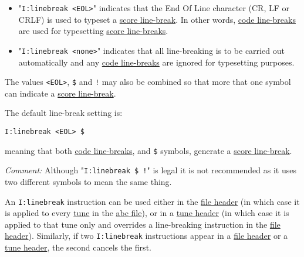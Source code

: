 \begin{itemize}
\item
  "\texttt{I:linebreak\ \textless{}EOL\textgreater{}}" indicates that
  the End Of Line character (CR, LF or CRLF) is used to typeset a
  \protect\hyperlink{score_line-break_definition}{score line-break}. In
  other words, \protect\hyperlink{code_line-break_definition}{code
  line-breaks} are used for typesetting
  \protect\hyperlink{score_line-break_definition}{score line-breaks}.
\end{itemize}

\begin{itemize}
\item
  "\texttt{I:linebreak\ \textless{}none\textgreater{}}" indicates that
  all line-breaking is to be carried out automatically and any
  \protect\hyperlink{code_line-break_definition}{code line-breaks} are
  ignored for typesetting purposes.
\end{itemize}

The values \texttt{\textless{}EOL\textgreater{}}, \texttt{\$} and
\texttt{!} may also be combined so that more that one symbol can
indicate a \protect\hyperlink{score_line-break_definition}{score
line-break}.

The default line-break setting is:

\begin{verbatim}
I:linebreak <EOL> $
\end{verbatim}

meaning that both \protect\hyperlink{code_line-break_definition}{code
line-breaks}, and \texttt{\$} symbols, generate a
\protect\hyperlink{score_line-break_definition}{score line-break}.

\emph{Comment:} Although "\texttt{I:linebreak\ \$\ !}" is legal it is
not recommended as it uses two different symbols to mean the same thing.

An \texttt{I:linebreak} instruction can be used either in the
\protect\hyperlink{file_header_definition}{file header} (in which case
it is applied to every \protect\hyperlink{abc_tune_definition}{tune} in
the \protect\hyperlink{abc_file_definition}{abc file}), or in a
\protect\hyperlink{tune_header_definition}{tune header} (in which case
it is applied to that tune only and overrides a line-breaking
instruction in the \protect\hyperlink{file_header_definition}{file
header}). Similarly, if two \texttt{I:linebreak} instructions appear in
a \protect\hyperlink{file_header_definition}{file header} or a
\protect\hyperlink{tune_header_definition}{tune header}, the second
cancels the first.

